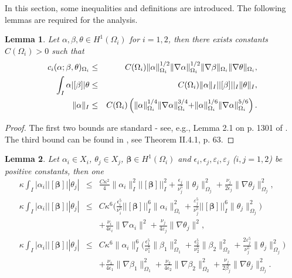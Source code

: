 \documentclass[10pt]{article}%
\numberwithin{equation}{section}
\newtheorem{lemma}{Lemma}[section]
\begin{document}
In this section, some inequalities and definitions are introduced. The following lemmas are required for the analysis. %
\begin{lemma} \label{Standard_ineqs} Let $\alpha, \beta, \theta \in H^1(\Omega_i)$  for $i=1,2$,  then there exists constants $ C(\Omega_i)>0$ such that
	\begin{eqnarray}
	c_i({\alpha};{\beta},\theta)_{\Omega_i}&\leq& C (\Omega_i) \|\alpha\|^{1/2}_{\Omega_i}\|\nabla \alpha\|_{\Omega_i}^{1/2}\|\nabla \beta\|_{\Omega_i}\|\nabla \theta\|_{\Omega_i},\nonumber\\
	\int_{I}\alpha |[\beta]| \theta &\leq& C(\Omega_i) \|\alpha \|_I ||[\beta]||_I \|\theta \|_I, \nonumber\\
	\|\alpha\|_I &\leq& C(\Omega_i) \left({\color{red} } \|\alpha\|^{1/4}_{\Omega_i}\|\nabla \alpha\|^{3/4}_{\Omega_i} { + \|\alpha\|^{1/6}_{\Omega_i}\|\nabla \alpha\|^{5/6}_{\Omega_i} }\right).
	\end{eqnarray}
\end{lemma}
\begin{proof}
The first two bounds are standard - see, e.g., Lemma 2.1 on p. 1301 of \cite{CHL12}. The third bound can be found in \cite{Galdi94}, see Theorem II.4.1, p. 63.
\end{proof}
\begin{lemma} \label{lem:nnl}Let $\alpha_i \in X_i$, $\theta_j \in X_j$, $\boldsymbol{\beta} \in H^1(\Omega_i)$ and  $\epsilon_i,\epsilon_j,\varepsilon_i,\varepsilon_j$ ($i,j=1,2$) be positive constants, then one
\begin{eqnarray}
\kappa \int_{I} |\alpha_i| |[ \boldsymbol{\beta}]||\theta_j|&\leq& \frac{C\kappa^2}{4}\|\alpha_i\|^2_I ||[ \boldsymbol{\beta}]||_I^2+\frac{\epsilon_j}{\nu_j^5}\|\theta_j\|^2_{\Omega_j}+\frac{\nu_j}{2\epsilon_j}\|\nabla \theta_j\|^2_{\Omega_j},\\
	\kappa \int_{I} |\alpha_i| |[ \boldsymbol{\beta}]||\theta_j|&\leq& C\kappa^6\Big(\frac{\epsilon_i^5}{\nu_i^5}||[ \boldsymbol{\beta}]||_I^6\|\alpha_i\|^2_{\Omega_i}+\frac{\varepsilon_j^5}{\nu_j^5}||[ \boldsymbol{\beta}]||_I^6\|\theta_j\|^2_{\Omega_j}\Big) \nonumber\\&&+\frac{\nu_i}{4\epsilon_i}\|\nabla \alpha_i\|^2+\frac{\nu_j}{4\varepsilon_j} \|\nabla \theta_j\|^2,\\
	\kappa \int_{I} |\alpha_i| |[ \boldsymbol{\beta}]||\theta_j|&\leq&C\kappa^6\|\alpha_i\|^6_I\Big(\frac{\epsilon_1^5}{\nu_1^5}\|\beta_1\|_{\Omega_1}^2+\frac{\epsilon_2^5}{\nu_2^5}\|\beta_2\|^2_{\Omega_2}+\frac{2\varepsilon_j^5}{\nu_j^5}\|\theta_j\|_{\Omega_j}^2\Big)\nonumber\\&&+\frac{\nu_1}{4\epsilon_1}\|\nabla \beta_1\|_{\Omega_1}^2+\frac{\nu_2}{4\epsilon_2}\|\nabla \beta_2\|^2_{\Omega_2}+\frac{\nu_j}{2\beta_j}\|\nabla \theta_j\|_{\Omega_j}^2.
\end{eqnarray}
\end{lemma}
\end{document}
